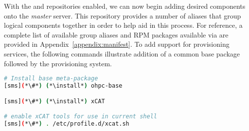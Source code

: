 
With the \OHPC{} and \xCAT{} repositories enabled, we can now begin adding desired components onto the {\em master}
server. This repository provides a number of aliases that group logical components together in order to help aid in this
process. For reference, a complete list of available group aliases and RPM packages available via \OHPC{} are provided
in Appendix~\ref{appendix:manifest}. To add support for provisioning services, the following commands illustrate
addition of a common base package followed by the \xCAT{} provisioning system.

\begin{lstlisting}[language=bash,keywords={}]
# Install base meta-package
[sms](*\#*) (*\install*) ohpc-base

[sms](*\#*) (*\install*) xCAT

# enable xCAT tools for use in current shell
[sms](*\#*) . /etc/profile.d/xcat.sh
\end{lstlisting}


